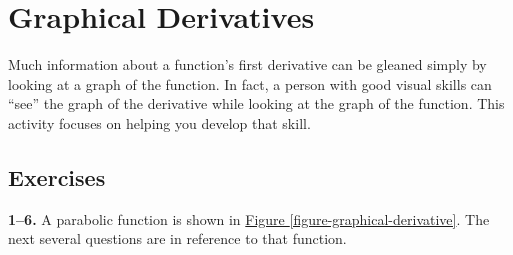 \documentclass[10pt,oneside,]{book}
\theoremstyle{plain}
\theoremstyle{definition}
\numberwithin{equation}{section}
\begin{document}
\section[Graphical Derivatives]{Graphical Derivatives}\label{section-graphical-derivatives}
Much information about a function's first derivative can be gleaned simply by looking at a graph of the function. In fact, a person with good visual skills can ``see'' the graph of the derivative while looking at the graph of the function. This activity focuses on helping you develop that skill.%
\typeout{************************************************}
\typeout{************************************************}
\subsection[Exercises]{Exercises}\label{exercises-25}
\textbf{1--6. }\hypertarget{exercisegroup-46}{\null}A parabolic function is shown in \hyperref[figure-graphical-derivative]{Figure \ref{figure-graphical-derivative}}. The next several questions are in reference to that function.%
\end{document}
